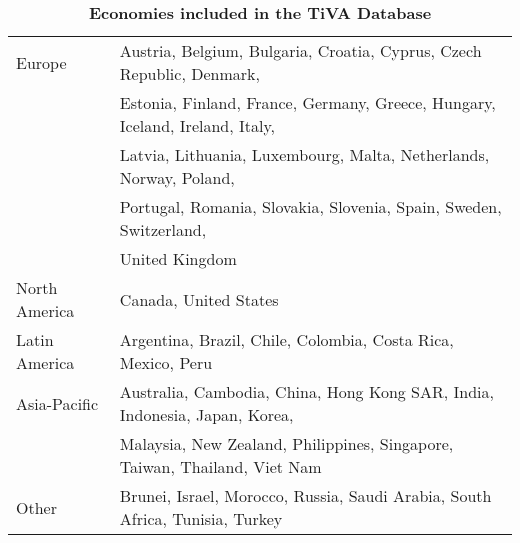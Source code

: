 \documentclass[11pt,a4paper]{article}
\begin{document}
\begin{table}[!h]
\begin{threeparttable}
\centering
\centering
\caption{\small{\textbf{Economies included in the TiVA Database}}}
\small
\begin{tabular}{ll}
\hline\hline
Europe & Austria, Belgium, Bulgaria, Croatia, Cyprus, Czech Republic, Denmark,\\
& Estonia, Finland, France, Germany, Greece, Hungary, Iceland, Ireland, Italy,\\
& Latvia, Lithuania, Luxembourg, Malta, Netherlands, Norway, Poland,\\
&Portugal, Romania, Slovakia, Slovenia, Spain, Sweden, Switzerland,\\
& United Kingdom\\
North  America& Canada, United States\\
Latin America & Argentina, Brazil, Chile, Colombia, Costa Rica, Mexico, Peru\\
Asia-Pacific & Australia, Cambodia, China, Hong Kong SAR, India, Indonesia, Japan, Korea,\\ &Malaysia, New Zealand, Philippines, Singapore, Taiwan, Thailand, Viet Nam\\
Other & Brunei, Israel, Morocco, Russia, Saudi Arabia, South Africa, Tunisia, Turkey\\
\hline\hline
\end{tabular} 
\label{tab:tiva}
\end{threeparttable}
\end{table} 
\end{document}
